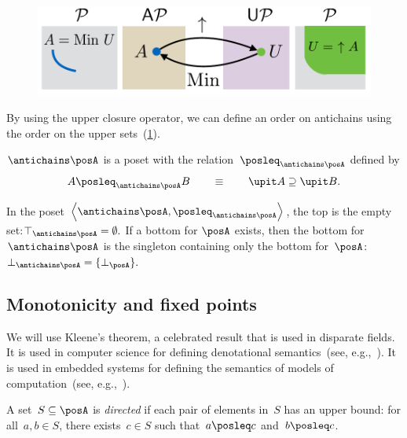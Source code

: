 \begin{figure}[h]
\begin{center}
    \includegraphics[scale=0.4]{papers/arxiv_submission_v6/gmcdp_antichains_upsets.pdf}
\end{center}
\caption{\label{fig:antichains_upsets}}
\end{figure}

By using the upper closure operator, we can define an order on antichains
using the order on the upper sets~(\cref{fig:antichains_upsets}).
\begin{lemma}
\label{lem:antichains-are-poset}$\antichains\posA$ is a poset with
the relation~$\posleq_{\antichains\posA}$ defined by
\[
A\posleq_{\antichains\posA}B\qquad\equiv\qquad\upit A\supseteq\upit B.
\]
\end{lemma}
In the poset $\left\langle \antichains\posA,\posleq_{\antichains\posA}\right\rangle $,
the top is the empty set:$\top_{\antichains\posA}=\emptyset.$ If
a bottom for $\posA$ exists, then the bottom for~$\antichains\posA$
is the singleton containing only the bottom for~$\posA$: $\bot_{\antichains\posA}=\{\bot_{\posA}\}.$


\subsection{Monotonicity and fixed points\label{sec:Monotonicity-and-fixed}}

We will use Kleene's theorem, a celebrated result that is used in
disparate fields. It is used in computer science for defining denotational
semantics~(see, e.g.,~\cite{manes86}). It is used in embedded systems
for defining the semantics of models of computation~(see, e.g.,~\cite{lee10}).

\begin{definition}
A set~$S\subseteq\posA$ is \emph{directed} if each pair of elements
in~$S$ has an upper bound: for all~$a,b\in S$, there exists~$c\in S$
such that~$a\posleq c$ and~$b\posleq c$.
\end{definition}

